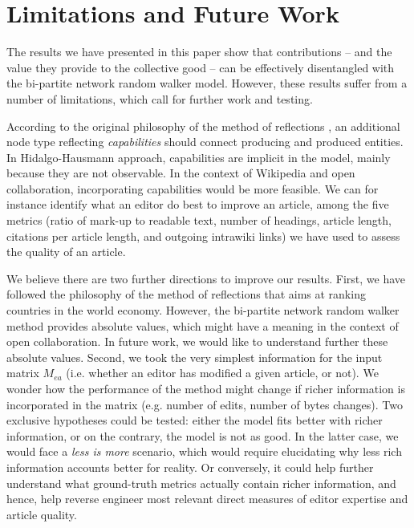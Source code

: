 \section{Limitations and Future Work}
The results we have presented in this paper show that contributions -- and the value they provide to the collective good -- can be effectively disentangled with the {bi-partite network random walker} model. However, these results suffer from a number of limitations, which call for further work and testing. 


According to the original philosophy of the method of reflections \cite{hidalgo2007}, an additional node type reflecting {\it capabilities} should connect producing and produced entities. In Hidalgo-Hausmann approach, capabilities are implicit in the model, mainly because they are not observable. In the context of Wikipedia and open collaboration, incorporating capabilities would be more feasible. We can for instance identify what an editor do best to improve an article, among the five metrics (ratio of mark-up to readable text, number of headings, article length, citations per article length, and outgoing intrawiki links) we have used to assess the quality of an article.

We believe there are two further directions to improve our results. First, we have followed the philosophy of the method of reflections that aims at ranking countries in the world economy. However, the bi-partite network random walker method provides absolute values, which might have a meaning in the context of open collaboration. In future work, we would like to understand further these absolute values. Second, we took the very simplest information for the input matrix $\mathbf{\mathit{M_{ea}}}$ (i.e. whether an editor has modified a given article, or not). We wonder how the performance of the method might change if richer information is incorporated in the matrix (e.g. number of edits, number of bytes changes). Two exclusive hypotheses could be tested: either the model fits better with richer information, or on the contrary, the model is not as good. In the latter case, we would face a {\it less is more} scenario, which would require elucidating why less rich information accounts better for reality. Or conversely, it could help further understand what ground-truth metrics actually contain richer information, and hence, help reverse engineer most relevant direct measures of editor expertise and article quality.

